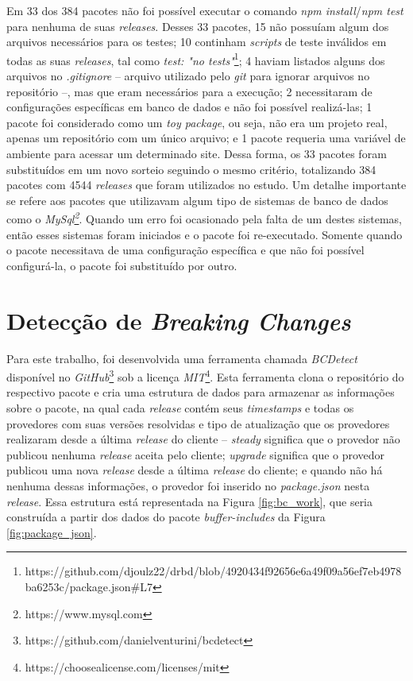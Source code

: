Em 33 dos 384 pacotes não foi possível executar o comando \textit{npm install}/\textit{npm test} para nenhuma de suas \textit{releases}. Desses 33 pacotes, 15 não possuíam algum dos arquivos necessários para os testes; 10 continham \textit{scripts} de teste inválidos em todas as suas \textit{releases}, tal como \textit{test: "no tests"}\footnote{https://github.com/djoulz22/drbd/blob/4920434f92656e6a49f09a56ef7eb4978ba6253c/package.json\#L7}; 4 haviam listados alguns dos arquivos no \textit{.gitignore} -- arquivo utilizado pelo \textit{git} para ignorar arquivos no repositório --, mas que eram necessários para a execução; 2 necessitaram de configurações específicas em banco de dados e não foi possível realizá-las; 1 pacote foi considerado como um \textit{toy package}, ou seja, não era um projeto real, apenas um repositório com um único arquivo; e 1 pacote requeria uma variável de ambiente para acessar um determinado site. Dessa forma, os 33 pacotes foram substituídos em um novo sorteio seguindo o mesmo critério, totalizando 384 pacotes com 4544 \textit{releases} que foram utilizados no estudo. Um detalhe importante se refere aos pacotes que utilizavam algum tipo de sistemas de banco de dados como o \textit{MySql\footnote{https://www.mysql.com}}. Quando um erro foi ocasionado pela falta de um destes sistemas, então esses sistemas foram iniciados e o pacote foi re-executado. Somente quando o pacote necessitava de uma configuração específica e que não foi possível configurá-la, o pacote foi substituído por outro.

\section{Detecção de \textit{Breaking Changes}}
\label{sec:bcdetect}
Para este trabalho, foi desenvolvida uma ferramenta chamada \textit{BCDetect} disponível no \textit{GitHub}\footnote{https://github.com/danielventurini/bcdetect} sob a licença \textit{MIT}\footnote{https://choosealicense.com/licenses/mit}. Esta ferramenta clona o repositório do respectivo pacote e cria uma estrutura de dados para armazenar as informações sobre o pacote, na qual cada \textit{release} contém seus \textit{timestamps} e todas os provedores com suas versões resolvidas e tipo de atualização que os provedores realizaram desde a última \textit{release} do cliente -- \textit{steady} significa que o provedor não publicou nenhuma \textit{release} aceita pelo cliente; \textit{upgrade} significa que o provedor publicou uma nova \textit{release} desde a última \textit{release} do cliente; e quando não há nenhuma dessas informações, o provedor foi inserido no \textit{package.json} nesta \textit{release}. Essa estrutura está representada na Figura \ref{fig:bc_work}, que seria construída a partir dos dados do pacote \textit{buffer-includes} da Figura \ref{fig:package_json}.

